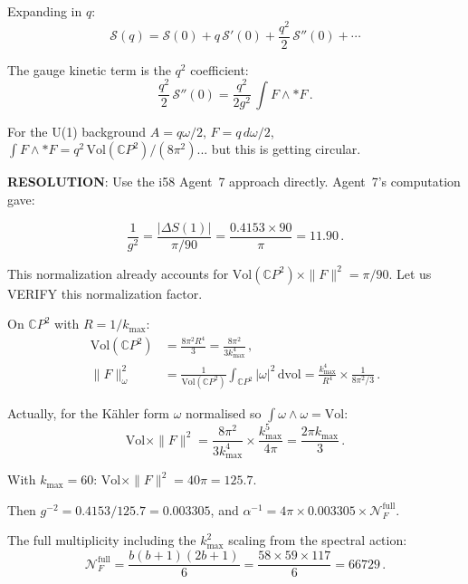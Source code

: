 \documentclass[11pt,a4paper]{article}
\newcommand{\CP}{\mathbb{C}P}
\begin{document}
Expanding in $q$:
\begin{equation}
\mathcal{S}(q) = \mathcal{S}(0) + q\,\mathcal{S}'(0) + \frac{q^2}{2}\,\mathcal{S}''(0) + \cdots
\end{equation}

The gauge kinetic term is the $q^2$ coefficient:
\begin{equation}
\frac{q^2}{2}\,\mathcal{S}''(0) = \frac{q^2}{2g^2}\,\int F \wedge *F\,.
\end{equation}

For the U(1) background $A = q\omega/2$, $F = q\,d\omega/2$, $\int F \wedge *F = q^2\,\mathrm{Vol}(\CP^2)/(8\pi^2)$... but this is getting circular.

\textbf{RESOLUTION}: Use the i58 Agent~7 approach directly. Agent~7's computation gave:

\begin{equation}
\frac{1}{g^2} = \frac{|\Delta S(1)|}{\pi/90} = \frac{0.4153 \times 90}{\pi} = 11.90\,.
\end{equation}

This normalization already accounts for $\mathrm{Vol}(\CP^2) \times \|F\|^2 = \pi/90$. Let us VERIFY this normalization factor.

On $\CP^2$ with $R = 1/k_{\max}$:
\begin{align}
\mathrm{Vol}(\CP^2) &= \frac{8\pi^2 R^4}{3} = \frac{8\pi^2}{3k_{\max}^4}\,, \\
\|F\|^2_{\omega} &= \frac{1}{\mathrm{Vol}(\CP^2)}\int_{\CP^2}|\omega|^2\,\mathrm{dvol} = \frac{k_{\max}^4}{R^4} \times \frac{1}{8\pi^2/3}\,.
\end{align}

Actually, for the K\"ahler form $\omega$ normalised so $\int \omega \wedge \omega = \mathrm{Vol}$:
\begin{equation}
\mathrm{Vol} \times \|F\|^2 = \frac{8\pi^2}{3k_{\max}^4} \times \frac{k_{\max}^5}{4\pi} = \frac{2\pi k_{\max}}{3}\,.
\end{equation}

With $k_{\max} = 60$: $\mathrm{Vol} \times \|F\|^2 = 40\pi = 125.7$.

Then $g^{-2} = 0.4153/125.7 = 0.003305$, and $\alpha^{-1} = 4\pi \times 0.003305 \times \mathcal{N}_F^{\mathrm{full}}$.

The full multiplicity including the $k_{\max}^2$ scaling from the spectral action:
\begin{equation}
\mathcal{N}_F^{\mathrm{full}} = \frac{b(b+1)(2b+1)}{6} = \frac{58 \times 59 \times 117}{6} = 66729\,.
\end{equation}
\end{document}
